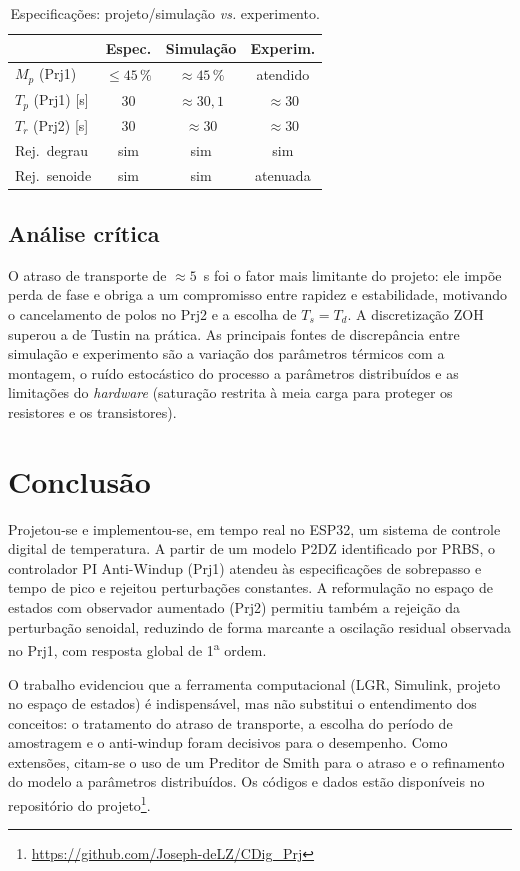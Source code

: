 \documentclass[a4paper]{ifacconf}
\begin{document}
\begin{table}[hb]
\begin{center}
\caption{Especificações: projeto/simulação \emph{vs.} experimento.}\label{tab:comp}
\begin{tabular}{lccc}
\hline
 & Espec. & Simulação & Experim. \\ \hline
$M_p$ (Prj1) & $\le 45\,\%$ & $\approx 45\,\%$ & atendido \\
$T_p$ (Prj1) [s] & 30 & $\approx 30{,}1$ & $\approx 30$ \\
$T_r$ (Prj2) [s] & 30 & $\approx 30$ & $\approx 30$ \\
Rej.\ degrau & sim & sim & sim \\
Rej.\ senoide & sim & sim & atenuada \\ \hline
\end{tabular}
\end{center}
\end{table}

\subsection{Análise crítica}
O atraso de transporte de $\approx 5$~s foi o fator mais limitante do projeto: ele impõe perda de
fase e obriga a um compromisso entre rapidez e estabilidade, motivando o cancelamento de polos no
Prj2 e a escolha de $T_s = T_d$. A discretização ZOH superou a de Tustin na prática. As principais
fontes de discrepância entre simulação e experimento são a variação dos parâmetros térmicos com a
montagem, o ruído estocástico do processo a parâmetros distribuídos e as limitações do
\emph{hardware} (saturação restrita à meia carga para proteger os resistores e os transistores).

\section{Conclusão}

Projetou-se e implementou-se, em tempo real no ESP32, um sistema de controle digital de
temperatura. A partir de um modelo P2DZ identificado por PRBS, o controlador PI Anti-Windup
(Prj1) atendeu às especificações de sobrepasso e tempo de pico e rejeitou perturbações
constantes. A reformulação no espaço de estados com observador aumentado (Prj2) permitiu também
a rejeição da perturbação senoidal, reduzindo de forma marcante a oscilação residual observada
no Prj1, com resposta global de 1\textsuperscript{a} ordem.

O trabalho evidenciou que a ferramenta computacional (LGR, Simulink, projeto no espaço de
estados) é indispensável, mas não substitui o entendimento dos conceitos: o tratamento do atraso
de transporte, a escolha do período de amostragem e o anti-windup foram decisivos para o
desempenho. Como extensões, citam-se o uso de um Preditor de Smith para o atraso e o refinamento
do modelo a parâmetros distribuídos. Os códigos e dados estão disponíveis no
repositório do projeto\footnote{\url{https://github.com/Joseph-deLZ/CDig_Prj}}.

\end{document}
